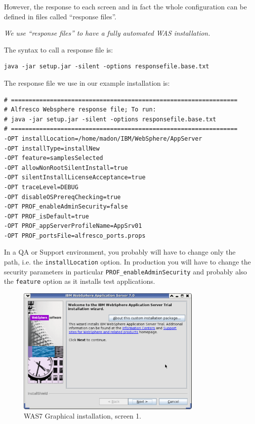 \documentclass[10pt,a4]{article}
\newenvironment{faster}{{\bf {\color{red}We do it FASTER:}} \em}{\par\normalfont}%
\begin{document}
However, the response to each screen and in fact the whole configuration can be defined in files called ``response files''.

\begin{faster}
We use ``response files'' to have a fully automated WAS installation.
\end{faster}


The syntax to call a response file is:

\begin{verbatim}
java -jar setup.jar -silent -options responsefile.base.txt 
\end{verbatim}

The response file we use in our example installation is:

\begin{verbatim}
# ================================================================
# Alfresco Websphere response file; To run:
# java -jar setup.jar -silent -options responsefile.base.txt 
# ================================================================
-OPT installLocation=/home/madon/IBM/WebSphere/AppServer
-OPT installType=installNew
-OPT feature=samplesSelected
-OPT allowNonRootSilentInstall=true
-OPT silentInstallLicenseAcceptance=true
-OPT traceLevel=DEBUG
-OPT disableOSPrereqChecking=true
-OPT PROF_enableAdminSecurity=false
-OPT PROF_isDefault=true
-OPT PROF_appServerProfileName=AppSrv01
-OPT PROF_portsFile=alfresco_ports.props
\end{verbatim}

In a QA or Support environment, you probably will have to change only the path, i.e. the {\tt installLocation} option. In production you will have to change the security parameters in particular {\tt PROF\_enableAdminSecurity} and probably also the {\tt feature} option as it installs test applications.

\begin{figure}[htb]
\begin{center}
\includegraphics[width=90mm]{ws01}
\caption{WAS7 Graphical installation, screen 1.}
\label{sc1}
\end{center}
\end{figure}
\end{document}

